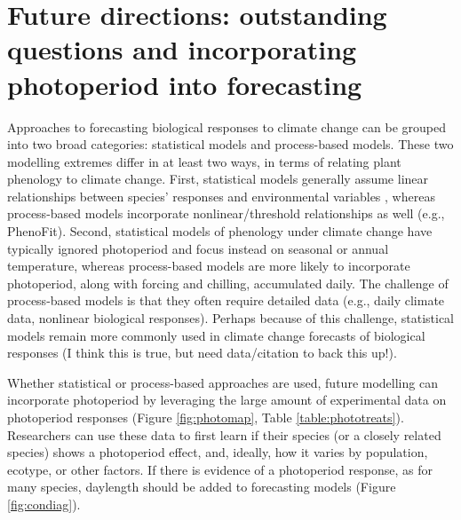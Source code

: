 \documentclass{article}
\begin{document}
\section*{Future directions: outstanding questions and incorporating photoperiod into forecasting}
\par Approaches to forecasting biological responses to climate change can be grouped into two broad categories: statistical models and process-based models. %
These two modelling extremes differ in at least two ways, in terms of relating plant phenology to climate change. First, statistical models generally assume linear relationships between species' responses and environmental variables \citep[e.g.,][]{}, whereas process-based models incorporate nonlinear/threshold relationships as well (e.g., PhenoFit). Second, statistical models of phenology under climate change have typically ignored photoperiod and focus instead on seasonal or annual temperature,%
whereas process-based models are more likely to incorporate photoperiod, along with forcing and chilling, accumulated daily. The challenge of process-based models is that they often require detailed data (e.g., daily climate data, nonlinear biological responses). Perhaps because of this challenge, statistical models remain more commonly used in climate change forecasts of biological responses (I think this is true, but need data/citation to back this up!). %
\par Whether statistical or process-based approaches are used, future modelling can incorporate photoperiod by leveraging the large amount of experimental data on photoperiod responses (Figure \ref{fig:photomap}, Table \ref{table:phototreats}). Researchers can use these data to first learn if their species (or a closely related species) shows a photoperiod effect, and, ideally, how it varies by population, ecotype, or other factors. If there is evidence of a photoperiod response, as for many species, daylength should be added to forecasting models (Figure \ref{fig:condiag}). 
\end{document}
